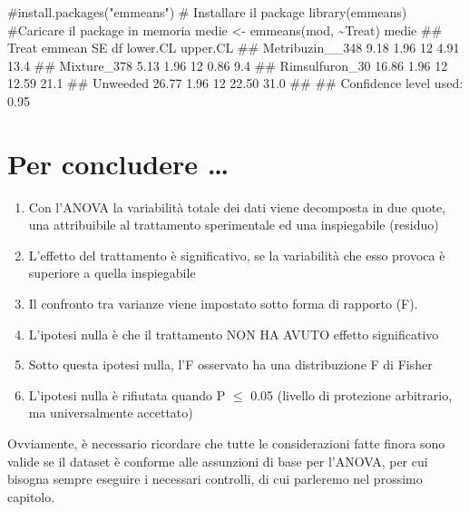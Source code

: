 \documentclass[a4paper,12pt,oneside]{book}
\providecommand{\tightlist}{%
  \setlength{\itemsep}{0pt}\setlength{\parskip}{0pt}}
\newenvironment{Shaded}{\begin{snugshade}}{\end{snugshade}}
\newcommand{\SpecialCharTok}[1]{#1}
\newcommand{\CommentTok}[1]{#1}
\newcommand{\DocumentationTok}[1]{#1}
\newcommand{\OtherTok}[1]{#1}
\newcommand{\FunctionTok}[1]{#1}
\newcommand{\NormalTok}[1]{#1}
\begin{document}
\begin{Shaded}
\begin{Highlighting}[]
\CommentTok{\#install.packages("emmeans") \# Installare il package}
\FunctionTok{library}\NormalTok{(emmeans) }\CommentTok{\#Caricare il package in memoria}
\NormalTok{medie }\OtherTok{\textless{}{-}} \FunctionTok{emmeans}\NormalTok{(mod, }\SpecialCharTok{\textasciitilde{}}\NormalTok{Treat)}
\NormalTok{medie}
\DocumentationTok{\#\#  Treat           emmean   SE df lower.CL upper.CL}
\DocumentationTok{\#\#  Metribuzin\_\_348   9.18 1.96 12     4.91     13.4}
\DocumentationTok{\#\#  Mixture\_378       5.13 1.96 12     0.86      9.4}
\DocumentationTok{\#\#  Rimsulfuron\_30   16.86 1.96 12    12.59     21.1}
\DocumentationTok{\#\#  Unweeded         26.77 1.96 12    22.50     31.0}
\DocumentationTok{\#\# }
\DocumentationTok{\#\# Confidence level used: 0.95}
\end{Highlighting}
\end{Shaded}

\hypertarget{per-concludere}{%
\section{Per concludere \ldots{}}\label{per-concludere}}

\begin{enumerate}
\def\labelenumi{\arabic{enumi}.}
\tightlist
\item
  Con l'ANOVA la variabilità totale dei dati viene decomposta in due quote, una attribuibile al trattamento sperimentale ed una inspiegabile (residuo)
\item
  L'effetto del trattamento è significativo, se la variabilità che esso provoca è superiore a quella inspiegabile
\item
  Il confronto tra varianze viene impostato sotto forma di rapporto (F).
\item
  L'ipotesi nulla è che il trattamento NON HA AVUTO effetto significativo
\item
  Sotto questa ipotesi nulla, l'F osservato ha una distribuzione F di Fisher
\item
  L'ipotesi nulla è rifiutata quando P \(\leq\) 0.05 (livello di protezione arbitrario, ma universalmente accettato)
\end{enumerate}

Ovviamente, è necessario ricordare che tutte le considerazioni fatte finora sono valide se il dataset è conforme alle assunzioni di base per l'ANOVA, per cui bisogna sempre eseguire i necessari controlli, di cui parleremo nel prossimo capitolo.
\end{document}
